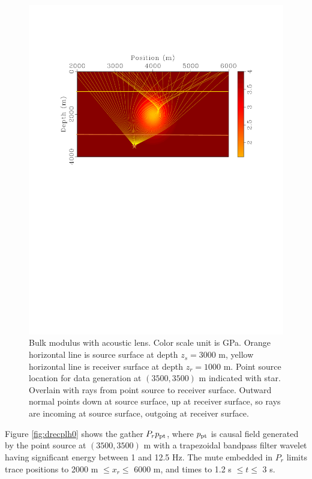 \documentclass[12pt]{geophysics}
\begin{document}
\begin{figure}
  \includegraphics[width=\textwidth]{olensrays0.pdf}
  \caption{Bulk modulus with acoustic lens. Color scale unit is
    GPa. Orange horizontal line is source surface at depth $z_s= 3000$
    m, yellow horizontal
    line is receiver surface at depth $z_r=1000$ m. Point source location for data
    generation at $(3500, 3500)$ m indicated with star. Overlain with rays from point
    source to receiver surface. Outward normal points down at source
    surface, up at receiver surface, so rays are incoming at source
    surface, outgoing at receiver surface.}
  \label{fig:olensrays0}
\end{figure}

Figure \ref{fig:drecplh0} shows the gather $P_rp_{\rm pt}$, where
$p_{\rm pt}$ is causal field generated by the point source at
$(3500,3500)$ m with a trapezoidal bandpass filter wavelet having
significant energy between 1 and 12.5 Hz. The mute embedded in $P_r$
limits trace positions to 2000 m $ \le x_r \le $ 6000 m, and times to
1.2 s $ \le t \le $ 3 s.
\end{document}
